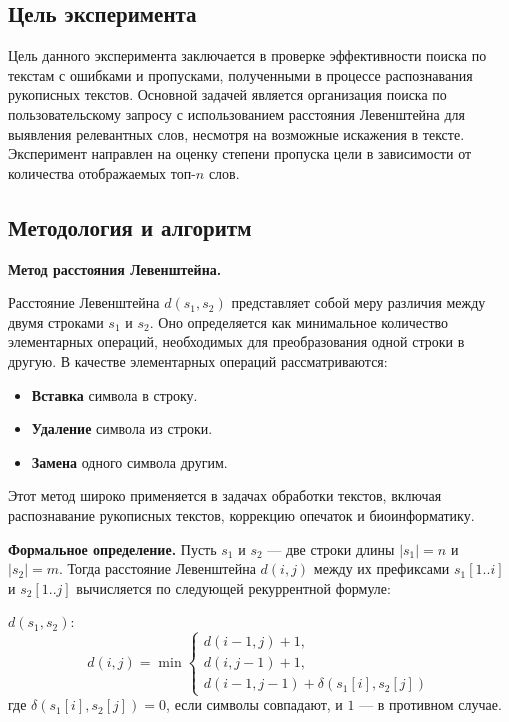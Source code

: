 \documentclass{article}
\begin{document}
\subsection{Цель эксперимента}
Цель данного эксперимента заключается в проверке эффективности поиска по текстам с ошибками и пропусками, полученными в процессе распознавания рукописных текстов. Основной задачей является организация поиска по пользовательскому запросу с использованием расстояния Левенштейна для выявления релевантных слов, несмотря на возможные искажения в тексте. Эксперимент направлен на оценку степени пропуска цели в зависимости от количества отображаемых топ-$n$ слов.

\subsection{Методология и алгоритм}

\textbf{Метод расстояния Левенштейна.} 

Расстояние Левенштейна $d(s_1, s_2)$ представляет собой меру различия между двумя строками $s_1$ и $s_2$. Оно определяется как минимальное количество элементарных операций, необходимых для преобразования одной строки в другую. В качестве элементарных операций рассматриваются:
\begin{itemize}
    \item \textbf{Вставка} символа в строку.
    \item \textbf{Удаление} символа из строки.
    \item \textbf{Замена} одного символа другим.
\end{itemize}
Этот метод широко применяется в задачах обработки текстов, включая распознавание рукописных текстов, коррекцию опечаток и биоинформатику.

\medskip
\textbf{Формальное определение.}  
Пусть $s_1$ и $s_2$ — две строки длины $|s_1| = n$ и $|s_2| = m$. Тогда расстояние Левенштейна $d(i,j)$ между их префиксами $s_1[1..i]$ и $s_2[1..j]$ вычисляется по следующей рекуррентной формуле:

$d(s_1, s_2)$:
    \[
    d(i, j) = \min \left\{
    \begin{array}{l}
        d(i-1, j) + 1, \\
        d(i, j-1) + 1, \\
        d(i-1, j-1) + \delta(s_1[i], s_2[j])
    \end{array} \right.
    \]
    где $\delta(s_1[i], s_2[j]) = 0$, если символы совпадают, и $1$ — в противном случае.
\end{document}

